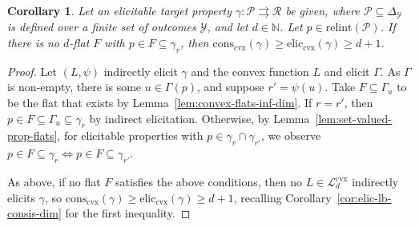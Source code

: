 \documentclass[11pt]{article} %
\newcommand{\Comments}{1}
\newcommand{\mytodo}[2]{\ifnum\Comments=1%
	\todo[linecolor=#1!80!black,backgroundcolor=#1,bordercolor=#1!80!black]{#2}\fi}
\newcommand{\jessiet}[1]{\mytodo{purple!20!white}{JF: #1}}
\newcommand{\simplex}{\Delta_\Y}
\newcommand{\relint}[1]{\mathrm{relint}(#1)}
\newcommand{\prop}[2][\mathcal{P}]{\mathrm{prop}_{#1}[#2]}
\newcommand{\eliccvx}{\mathrm{elic}_\mathrm{cvx}}
\newcommand{\conscvx}{\mathrm{cons}_\mathrm{cvx}}
\newcommand{\Pcodimension}{$\mathcal{P}$-codimension\,}
\renewcommand{\L}{\mathcal{L}}
\newcommand{\Lcvx}{\mathcal{L}^{\mathrm{cvx}}}
\newcommand{\R}{\mathcal{R}}
\renewcommand{\P}{\mathcal{P}}
\newcommand{\Y}{\mathcal{Y}}
\newcommand{\toto}{\rightrightarrows}
\newtheorem{corollary}{Corollary}
\begin{document}
\begin{corollary}\label{cor:Pcodim-flat-elic-relint-prop} 
	Let an elicitable target property $\gamma:\P \toto \R$ be given, where $\P\subseteq\simplex$ is defined over a finite set of outcomes $\Y$, and let $d\in\mathbb N$.
	Let $p \in \relint{\P}$.
	If there is no $d$-flat $F$ with $p \in F \subseteq \gamma_r$, then $\conscvx(\gamma) \geq \eliccvx(\gamma) \geq d + 1$.%
\end{corollary}
\begin{proof}
	Let $(L, \psi)$ indirectly elicit $\gamma$ and the convex function $L$ and elicit $\Gamma$.
	As $\Gamma$ is non-empty, there is some $u \in \Gamma(p)$, and suppose $r' = \psi(u)$.
	Take $F \subseteq \Gamma_u$ to be the flat that exists by Lemma~\ref{lem:convex-flats-inf-dim}.
	If $r = r'$, then $p \in F \subseteq \Gamma_u \subseteq \gamma_r$ by indirect elicitation.
	Otherwise, by Lemma~\ref{lem:set-valued-prop-flats}, for elicitable properties with $p \in \gamma_r \cap \gamma_{r'}$, we observe $p \in F\subseteq \gamma_r \iff p \in F \subseteq \gamma_{r'}$.
	
	As above, if no flat $F$ satisfies the above conditions, then no $L\in\Lcvx_d$ indirectly elicits $\gamma$, so $\conscvx(\gamma) \geq \eliccvx(\gamma) \geq d+1$, recalling Corollary~\ref{cor:elic-lb-consis-dim} for the first inequality.
\end{proof}

\end{document}
